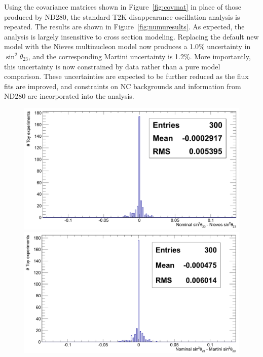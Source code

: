 Using the \nuprismlite covariance matrices shown in Figure~\ref{fig:covmat} in place of those produced by ND280, the standard T2K \numu disappearance oscillation analysis is repeated. The results are shown in Figure~\ref{fig:numuresults}. As expected, the \nuprismlite analysis is largely insensitive to cross section modeling. Replacing the default new model with the Nieves multinucleon model now produces a 1.0\% uncertainty in $\sin^2\theta_{23}$, and the corresponding Martini uncertainty is 1.2\%. More importantly, this uncertainty is now constrained by data rather than a pure model comparison. These uncertainties are expected to be further reduced as the flux fits are improved, and \nuprismlite constraints on NC backgrounds and information from ND280 are incorporated into the analysis.

\begin{figure}[htpb]
\begin{center}
  \begin{minipage}[t]{.45\textwidth}
    \begin{center}
      \includegraphics[width=\textwidth] {figures/Nieves_Sin2theta_Comp.png}
    \end{center}
  \end{minipage}
  \begin{minipage}[t]{.45\textwidth}
    \begin{center}
      \includegraphics[width=\textwidth] {figures/Martini_Sin2theta_Comp.png}

\end{center}
\end{minipage}
\end{center}
\end{figure}
